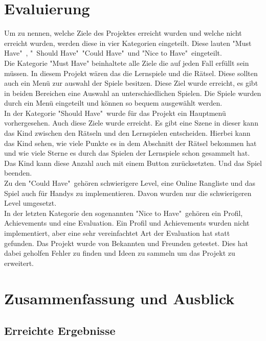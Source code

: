\chapter{Evaluierung}
Um zu nennen, welche Ziele des Projektes erreicht wurden und welche nicht erreicht wurden, werden diese in vier Kategorien eingeteilt. Diese lauten "Must Have"\ , "\ Should Have"\, "Could Have"\ und "Nice to Have"\ eingeteilt.\\
Die Kategorie "Must Have" beinhaltete alle Ziele die auf jeden Fall erfüllt sein müssen. In diesem Projekt wären das die Lernspiele und die Rätsel. Diese sollten auch ein Menü zur auswahl der Spiele besitzen. Diese Ziel wurde erreicht, es gibt in beiden Bereichen eine Auswahl an unterschiedlichen Spielen. Die Spiele wurden durch ein Menü eingeteilt und können so bequem ausgewählt werden.\\
In der Kategorie "Should Have"\ wurde für das Projekt ein Hauptmenü vorhergesehen. Auch diese Ziele wurde erreicht. Es gibt eine Szene in dieser kann das Kind zwischen den Rätseln und den Lernspielen entscheiden. Hierbei kann das Kind sehen, wie viele Punkte es in dem Abschnitt der Rätsel bekommen hat und wie viele Sterne es durch das Spielen der Lernspiele schon gesammelt hat. Das Kind kann diese Anzahl auch mit einem Button zurücksetzten. Und das Spiel beenden.\\
Zu den "Could Have"\ gehören schwierigere Level, eine Online Rangliste und das Spiel auch für Handys zu implementieren. Davon wurden nur die schwierigeren Level umgesetzt.\\
In der letzten Kategorie den sogenannten "Nice to Have"\, gehören ein Profil, Achievements und eine Evaluation. Ein Profil und Achievements wurden nicht implementiert, aber eine sehr vereinfachtet Art der Evaluation hat statt gefunden. Das Projekt wurde von Bekannten und Freunden getestet. Dies hat dabei geholfen Fehler zu finden und Ideen zu sammeln um das Projekt zu erweitert.\\

\chapter{Zusammenfassung und Ausblick}
\label{cha:zusammenfassung}

\section{Erreichte Ergebnisse}
\label{sec:ergebnisse}

